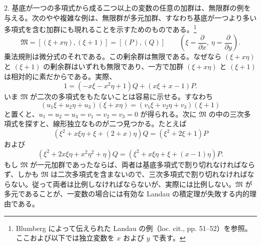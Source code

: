 \documentclass[11pt]{article}
\begin{document}
2. 基底が一つの多項式から成る二つ以上の変数の任意の加群は、無限群の例を与える。次のやや複雑な例は、無限群が多元加群、すなわち基底が一つより多い多項式を含む加群にも現れることを示すためのものである。\footnote{Blumberg によって伝えられた Landau の例（loc. cit., pp. 51--52）を参照。ここおよび以下では独立変数を $x$ および $y$ で表す。}
\[
 \mathfrak M=[(\xi+x\eta),(\xi+1)]=[(P),(Q)]
 \qquad\left(\xi=\frac{\partial}{\partial x},\ \eta=\frac{\partial}{\partial y}\right).
\]
乗法規則は微分式のそれである。この剰余群は無限である。なぜなら $(\xi+x\eta)$ と $(\xi+1)$ の剰余群はいずれも無限であり、一方で加群 $(\xi+x\eta)$ と $(\xi+1)$ は相対的に素だからである。実際、
\[
 1=(-x\xi-x^2\eta+1)Q+(x\xi+x-1)P.
\]
いま $\mathfrak M$ が二次の多項式をもたないことは容易に示せる。すなわち
\[
 (u_1\xi+u_2\eta+u_3)(\xi+x\eta)=(v_1\xi+v_2\eta+v_3)(\xi+1)
\]
と置くと、$u_1=u_2=u_3=v_1=v_2=v_3=0$ が得られる。次に $\mathfrak M$ の中の三次多項式を探すと、線形独立なものが二つ見つかる。たとえば
\[
 (\xi^2+x\xi\eta+\xi+(2+x)\eta)Q=(\xi^2+2\xi+1)P
\]
および
\[
 (\xi^2+2x\xi\eta+x^2\eta^2+\eta)Q
 =(\xi^2+x\xi\eta+\xi+(x-1)\eta)P.
\]
もし $\mathfrak M$ が一元加群であったならば、両者は基底多項式で割り切れなければならず、しかも $\mathfrak M$ は二次多項式を含まないので、三次多項式で割り切れなければならない。従って両者は比例しなければならないが、実際には比例しない。$\mathfrak M$ が多元であることが、一変数の場合には有効な Landau の積定理が失敗する内的理由である。
\end{document}
